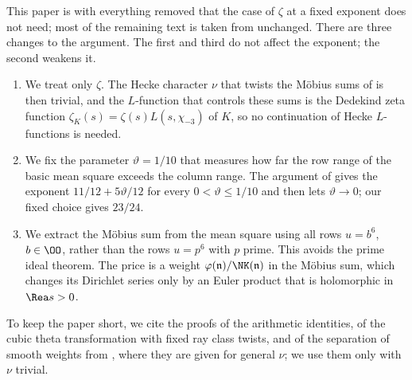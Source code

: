 This paper is \cite{OpenAI26b} with everything removed that the case of $\zeta$ at a fixed exponent does not need; most of the remaining text is taken from \cite{OpenAI26b} unchanged. There are three changes to the argument. The first and third do not affect the exponent; the second weakens it.
\begin{enumerate}
\item We treat only $\zeta$. The Hecke character $\nu$ that twists the M\"obius sums of \cite{OpenAI26b} is then trivial, and the $L$-function that controls these sums is the Dedekind zeta function $\zeta_K(s)=\zeta(s)L(s,\chi_{-3})$ of $K$, so no continuation of Hecke $L$-functions is needed.
\item We fix the parameter $\vartheta=1/10$ that measures how far the row range of the basic mean square exceeds the column range. The argument of \cite{OpenAI26b} gives the exponent $11/12+5\vartheta/12$ for every $0<\vartheta\le1/10$ and then lets $\vartheta\to0$; our fixed choice gives $23/24$.
\item We extract the M\"obius sum from the mean square using all rows $u=b^6$, $b\in\OO$, rather than the rows $u=p^6$ with $p$ prime. This avoids the prime ideal theorem. The price is a weight $\varphi(\mathfrak n)/\NK(\mathfrak n)$ in the M\"obius sum, which changes its Dirichlet series only by an Euler product that is holomorphic in $\Rea s>0$.
\end{enumerate}
To keep the paper short, we cite the proofs of the arithmetic identities, of the cubic theta transformation with fixed ray class twists, and of the separation of smooth weights from \cite[Appendices~A and~B]{OpenAI26b}, where they are given for general $\nu$; we use them only with $\nu$ trivial.

